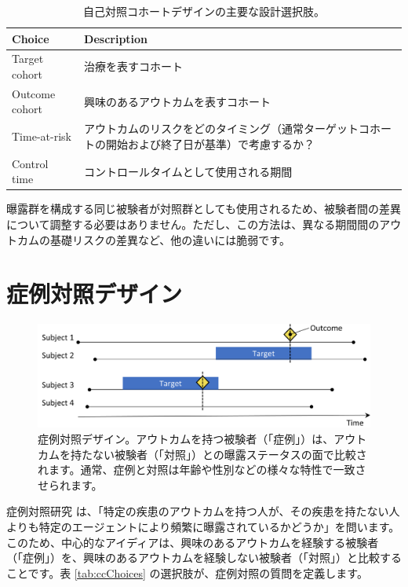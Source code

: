 \documentclass[
  11pt]{book}
\theoremstyle{definition}
\theoremstyle{definition}
\theoremstyle{definition}
\theoremstyle{definition}
\theoremstyle{remark}
\begin{document}
\begin{table}
\centering
\caption{\label{tab:sccChoices}自己対照コホートデザインの主要な設計選択肢。}
\centering
\begin{tabular}[t]{l>{\raggedright\arraybackslash}p{9cm}}
\toprule
Choice & Description\\
\midrule
Target cohort & 治療を表すコホート\\
Outcome cohort & 興味のあるアウトカムを表すコホート\\
Time-at-risk & アウトカムのリスクをどのタイミング（通常ターゲットコホートの開始および終了日が基準）で考慮するか？\\
Control time & コントロールタイムとして使用される期間\\
\bottomrule
\end{tabular}
\end{table}

曝露群を構成する同じ被験者が対照群としても使用されるため、被験者間の差異について調整する必要はありません。ただし、この方法は、異なる期間間のアウトカムの基礎リスクの差異など、他の違いには脆弱です。

\section{症例対照デザイン}\label{ux75c7ux4f8bux5bfeux7167ux30c7ux30b6ux30a4ux30f3}


\begin{figure}[h]

{\centering \includegraphics[width=0.9\linewidth]{images/PopulationLevelEstimation/caseControl} 

}

\caption{症例対照デザイン。アウトカムを持つ被験者（「症例」）は、アウトカムを持たない被験者（「対照」）との曝露ステータスの面で比較されます。通常、症例と対照は年齢や性別などの様々な特性で一致させられます。}\label{fig:caseControl}
\end{figure}

症例対照研究 \citep[ ]{vandenbroucke_2012} は、「特定の疾患のアウトカムを持つ人が、その疾患を持たない人よりも特定のエージェントにより頻繁に曝露されているかどうか」を問います。このため、中心的なアイディアは、興味のあるアウトカムを経験する被験者（「症例」）を、興味のあるアウトカムを経験しない被験者（「対照」）と比較することです。表 \ref{tab:ccChoices} の選択肢が、症例対照の質問を定義します。  
\end{document}
